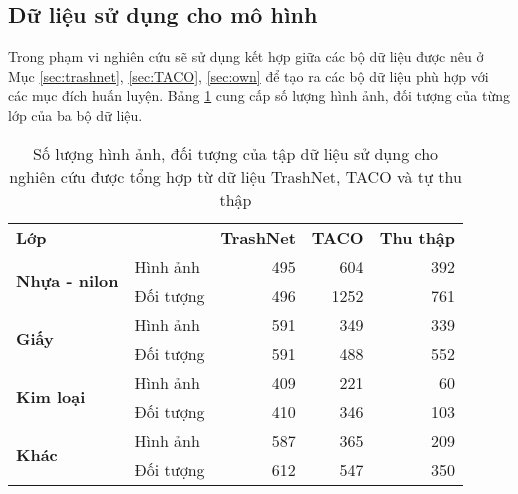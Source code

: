 \documentclass[../the.tex]{subfiles}
\begin{document}
\subsection{Dữ liệu sử dụng cho mô hình}
{\fontsize{13}{12} \selectfont

	Trong phạm vi nghiên cứu sẽ sử dụng kết hợp giữa các bộ dữ liệu được nêu ở Mục \ref{sec:trashnet}, \ref{sec:TACO}, \ref{sec:own} để tạo ra các bộ dữ liệu phù hợp với các mục đích huấn luyện.
	Bảng \ref{tab:datasetmain} cung cấp số lượng hình ảnh, đối tượng của từng lớp của ba bộ dữ liệu.

}


\begin{table}[h]
	\centering
	\caption{Số lượng hình ảnh, đối tượng của tập dữ liệu sử dụng cho nghiên cứu được tổng hợp từ dữ liệu TrashNet, TACO và tự thu thập}
	\begin{tabular}{|l|l|r|r|r|}
		\cline{1-5}
		\textbf{Lớp}                           &            & \textbf{TrashNet} & \textbf{TACO} & \textbf{Thu thập} \\ \cline{1-5}
		\multirow{2}{*}{\textbf{Nhựa - nilon}} & Hình ảnh   & 495               & 604           & 392               \\ \cline{2-5}
		                                       & Đối tượng  & 496               & 1252          & 761               \\ \cline{1-5}
		\multirow{2}{*}{\textbf{Giấy}}         & Hình ảnh   & 591               & 349           & 339               \\ \cline{2-5}
		                                       & Đối tượng  & 591               & 488           & 552               \\ \cline{1-5}
		\multirow{2}{*}{\textbf{Kim loại}}     & Hình ảnh   & 409               & 221           & 60                \\ \cline{2-5}
		                                       & Đối tượng  & 410               & 346           & 103               \\ \cline{1-5}
		\multirow{2}{*}{\textbf{Khác}}         & Hình   ảnh & 587               & 365           & 209               \\ \cline{2-5}
		                                       & Đối tượng  & 612               & 547           & 350               \\ \cline{1-5}
	\end{tabular}
	\label{tab:datasetmain}
\end{table}
\end{document}
